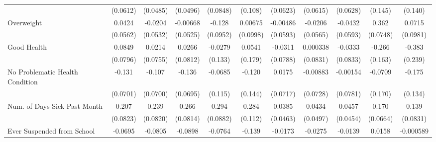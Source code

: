 {\begin{tabular}{l*{10}{c}}
            &    (0.0612)         &    (0.0485)         &    (0.0496)         &    (0.0848)         &     (0.108)         &    (0.0623)         &    (0.0615)         &    (0.0628)         &     (0.145)         &     (0.140)         \\
\addlinespace
Overweight  &      0.0424         &     -0.0204         &    -0.00668         &      -0.128         &     0.00675         &    -0.00486         &     -0.0206         &     -0.0432         &       0.362\sym{***}&      0.0715         \\
            &    (0.0562)         &    (0.0532)         &    (0.0525)         &    (0.0952)         &    (0.0998)         &    (0.0593)         &    (0.0565)         &    (0.0593)         &    (0.0748)         &    (0.0981)         \\
\addlinespace
Good Health &      0.0849         &      0.0214         &      0.0266         &     -0.0279         &      0.0541         &     -0.0311         &    0.000338         &     -0.0333         &      -0.266         &      -0.383         \\
            &    (0.0796)         &    (0.0755)         &    (0.0812)         &     (0.133)         &     (0.179)         &    (0.0788)         &    (0.0831)         &    (0.0833)         &     (0.163)         &     (0.239)         \\
\addlinespace
No Problematic Health Condition&      -0.131         &      -0.107         &      -0.136         &     -0.0685         &      -0.120         &      0.0175         &    -0.00883         &    -0.00154         &     -0.0709         &      -0.175         \\
            &    (0.0701)         &    (0.0700)         &    (0.0695)         &     (0.115)         &     (0.144)         &    (0.0717)         &    (0.0728)         &    (0.0781)         &     (0.170)         &     (0.134)         \\
\addlinespace
Num. of Days Sick Past Month&       0.207\sym{*}  &       0.239\sym{**} &       0.266\sym{**} &       0.294\sym{***}&       0.284\sym{*}  &      0.0385         &      0.0434         &      0.0457         &       0.170\sym{*}  &       0.139         \\
            &    (0.0823)         &    (0.0820)         &    (0.0814)         &    (0.0882)         &     (0.112)         &    (0.0463)         &    (0.0497)         &    (0.0454)         &    (0.0664)         &    (0.0831)         \\
\addlinespace
Ever Suspended from School&     -0.0695         &     -0.0805\sym{*}  &     -0.0898\sym{*}  &     -0.0764         &      -0.139         &     -0.0173         &     -0.0275         &     -0.0139         &      0.0158         &   -0.000589         \\

\end{tabular}}

